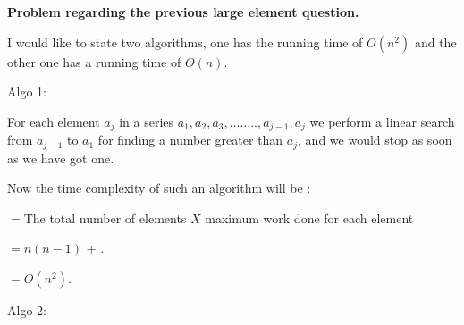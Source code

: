 \documentclass[letterpaper,portrait,12pt]{article}
\begin{document}
\begin{flushleft}
\textbf{Problem regarding the previous large element question.}
\end{flushleft}


\begin{flushleft}

\end{flushleft}


\begin{flushleft}
I would like to state two algorithms, one has the running time of $O(n^2)
$ and the other one has a running time of $O(n)
$.
\end{flushleft}


\begin{flushleft}

\end{flushleft}


\begin{flushleft}
Algo 1:
\end{flushleft}


\begin{flushleft}
	For each element $a_j$ in a series  $a_1,a_2,a_3,........,a_{j-1},a_j$ we perform a linear search from $a_{j-1}$ to $a_1$ for finding a number greater than $a_j$, and we would stop as soon as we have got one.
\end{flushleft}


\begin{flushleft}

\end{flushleft}


\begin{flushleft}
Now the time complexity of such an algorithm will be :
\end{flushleft}


\begin{flushleft}
$= $The total number of elements $X$ maximum work done for each element
\end{flushleft}


\begin{flushleft}
$= n (n-1)$ + .
\end{flushleft}


\begin{flushleft}
$= O(n^2)$.
\end{flushleft}


\begin{flushleft}

\end{flushleft}


\begin{flushleft}
Algo 2:
\end{flushleft}
\end{document}
